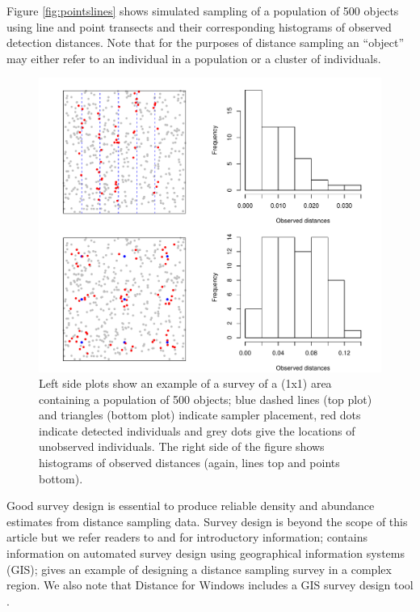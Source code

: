\documentclass[article,shortnames]{jss}
\begin{document}
Figure \ref{fig:pointslines} shows simulated sampling of a population of
500 objects using line and point transects and their corresponding
histograms of observed detection distances. Note that for the purposes
of distance sampling an ``object'' may either refer to an individual in
a population or a cluster of individuals.

\begin{CodeChunk}
\begin{figure}

{\centering \includegraphics{paper_files/figure-latex/points-and-lines-1} 

}

\caption{Left side plots show an example of a survey of a (1x1) area containing a population of 500 objects; blue dashed lines (top plot) and triangles (bottom plot) indicate sampler placement, red dots indicate detected individuals and grey dots give the locations of unobserved individuals. The right side of the figure shows histograms of observed distances (again, lines top and points bottom).\label{fig:pointslines}}\label{fig:points-and-lines}
\end{figure}
\end{CodeChunk}

Good survey design is essential to produce reliable density and
abundance estimates from distance sampling data. Survey design is beyond
the scope of this article but we refer readers to \citet[Chapter
7]{Buckland:2001vm} and \citet[Chapter 2]{buckland2015distance} for
introductory information; \citet{Strindberg:2004vr} contains information
on automated survey design using geographical information systems (GIS);
\citet{Thomas:2007wz} gives an example of designing a distance sampling
survey in a complex region. We also note that Distance for Windows
includes a GIS survey design tool \citep{Thomas:2010cf}.
\end{document}
